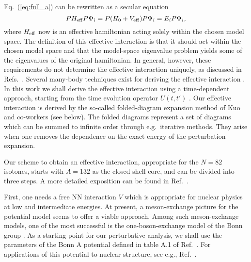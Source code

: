 Eq.\ (\ref{eq:full_a})  can be rewritten as a secular equation
\begin{equation}
    PH_{\rm{eff}}P\Psi_i=P(H_{0}+V_{\rm{eff}})
    P\Psi_i=E_iP\Psi_i,
\end{equation}
where $H_{\rm{eff}}$  now is an effective hamiltonian acting solely
within the chosen model space. The definition of this effective interaction
is that it should act within the chosen model space and that the model-space
eigenvalue problem yields some of the
eigenvalues of the original hamiltonian. In general, however, 
these requirements do not determine the effective interaction
uniquely, as discussed in Refs.\ \cite{hko95,ko90,so95,sok94}. Several
many-body techniques exist for deriving the effective interaction
\cite{hko95,so95,sok94,brandow67}. In this work we shall derive the effective
interaction using a time-dependent approach, starting from the time 
evolution operator $U(t,t')$ \cite{ko90}.
Our effective interaction is derived by the so-called folded-diagram 
expansion method of Kuo and co-workers \cite{ko90} (see below). The folded 
diagrams represent a set of diagrams which can be summed to infinite order 
through e.g.\ iterative methods. They arise when one removes the 
dependence on the exact energy of the perturbation expansion. 

Our scheme to obtain an effective interaction, appropriate for the $N=82$ 
isotones, starts with $A=132$ as the closed-shell core, and  can be divided 
into three steps. A  more detailed exposition can be found in Ref.\ 
\cite{hko95}.

First, one needs a free NN interaction $V$ which is
appropriate for nuclear physics at low and intermediate energies. At
present, a meson-exchange picture for the potential model seems to offer a
viable approach. Among such meson-exchange
models, one of the most successful is the one-boson-exchange model of the
Bonn group \cite{mac89}. As a starting point for our perturbative analysis, 
we shall use the parameters of the Bonn A potential defined in table A.1 of 
Ref.\ \cite{mac89}. For applications of this potential to 
nuclear structure, see e.g., Ref.\ \cite{mac89}.

